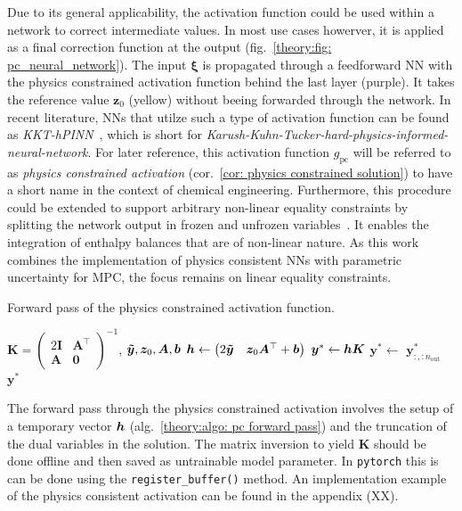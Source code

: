 Due to its general applicability, the activation function could be used within a network to correct intermediate values.
In most use cases howerver, it is applied as a final correction function at the output (fig.~\ref{theory:fig: pc_neural_network}).
The input $\bm{\xi}$ is propagated through a feedforward NN with the physics constrained activation function behind the last layer (purple).
It takes the reference value $\bm{z}_0$ (yellow) without beeing forwarded through the network.
In recent literature, NNs that utilze such a
type of activation function can be found as \emph{KKT-hPINN}~\cite{chen2024}, which is short 
for \emph{Karush-Kuhn-Tucker-hard-physics-informed-neural-network}.
For later reference, this activation function $g_\text{pc}$ will be referred to as \emph{physics constrained activation} (cor.~\ref{cor: physics constrained solution}) to have
a short name in the context of chemical engineering. 
Furthermore, this procedure could be extended
to support arbitrary non-linear equality constraints by splitting the network output in frozen and unfrozen variables~\cite{lastrucci2025}.
It enables the integration of enthalpy balances that are of non-linear nature. As this work combines the implementation
of physics consistent NNs with parametric uncertainty for MPC, the focus remains on linear equality constraints.

\begin{algorithm}
	\caption{Forward pass of the physics constrained activation function.}
	\label{theory:algo: pc forward pass}
	\begin{algorithmic}
		\REQUIRE $\bm{K} = 
            \begin{pmatrix}
                2 \bm{I} & \bm{A}^\top  \\
                \bm{A} & \bm{0}   
            \end{pmatrix} ^{-1} $,
                $\bm{\tilde{y}}, {\bm{z}}_{0}, \bm{A}, \bm{b}$
		\STATE $\bm{h} \leftarrow 
            \begin{pmatrix}
                2 \bm{\tilde{y}} & \bm{z}_0 \bm{A}^\top + {\bm{b}}
            \end{pmatrix}$
        \STATE $\bm{y}^* \leftarrow {\bm{h}} \bm{K}$
        \STATE $\bm{y}^* \leftarrow $ $\bm{y}^*_{:,:n_\text{out}}$
        \RETURN $\bm{y}^*$
	\end{algorithmic}
\end{algorithm}

The forward pass through the physics constrained activation involves the setup of a temporary vector ${\bm{h}}$ (alg.~\ref{theory:algo: pc forward pass})
and the truncation of the dual variables in the solution. The matrix inversion to yield $\bm{K}$ should be done 
offline and then saved as untrainable model parameter. In \texttt{pytorch} this is can be done using the
\texttt{register\_buffer()} method. An implementation example of the physics consistent activation can be found in the appendix (XX).

